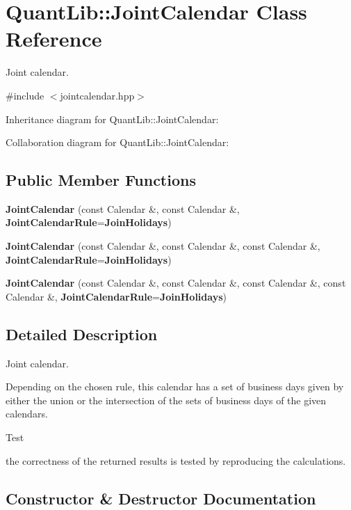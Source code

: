 \section{Quant\+Lib\+:\+:Joint\+Calendar Class Reference}
\label{class_quant_lib_1_1_joint_calendar}


Joint calendar.  




{\ttfamily \#include $<$jointcalendar.\+hpp$>$}



Inheritance diagram for Quant\+Lib\+:\+:Joint\+Calendar\+:


Collaboration diagram for Quant\+Lib\+:\+:Joint\+Calendar\+:
\subsection*{Public Member Functions}
\begin{DoxyCompactItemize}
\item 
{\bf Joint\+Calendar} (const Calendar \&, const Calendar \&, {\bf Joint\+Calendar\+Rule}={\bf Join\+Holidays})
\item 
{\bf Joint\+Calendar} (const Calendar \&, const Calendar \&, const Calendar \&, {\bf Joint\+Calendar\+Rule}={\bf Join\+Holidays})
\item 
{\bf Joint\+Calendar} (const Calendar \&, const Calendar \&, const Calendar \&, const Calendar \&, {\bf Joint\+Calendar\+Rule}={\bf Join\+Holidays})
\end{DoxyCompactItemize}


\subsection{Detailed Description}
Joint calendar. 

Depending on the chosen rule, this calendar has a set of business days given by either the union or the intersection of the sets of business days of the given calendars.

\begin{DoxyRefDesc}{Test}
\item[{\bf Test}]the correctness of the returned results is tested by reproducing the calculations. \end{DoxyRefDesc}


\subsection{Constructor \& Destructor Documentation}
